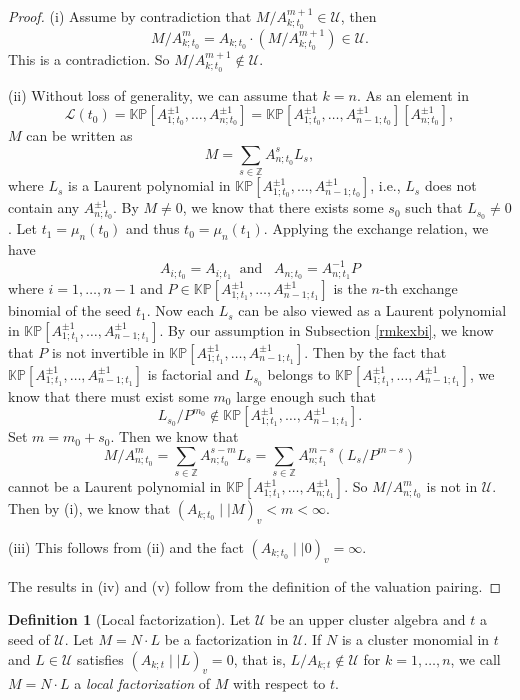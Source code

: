 \documentclass{amsart}
\theoremstyle{definition}
\newtheorem{definition}[theorem]{Definition}
\theoremstyle{remark}
\numberwithin{equation}{section}
\begin{document}
\begin{proof}
(i) Assume by contradiction that $M/A_{k;t_0}^{m+1}\in \mathcal U$, then $$M/A_{k;t_0}^m=A_{k;t_0}\cdot (M/A_{k;t_0}^{m+1})\in\mathcal U.$$ This is a contradiction. So $M/A_{k;t_0}^{m+1}\notin \mathcal U$.

(ii) Without loss of generality, we can assume that $k=n$.
As an element in $${\mathcal L}(t_0)=\mathbb {KP}[A_{1;t_0}^{\pm 1},\ldots,A_{n;t_0}^{\pm 1}]=\mathbb {KP}[A_{1;t_0}^{\pm 1},\ldots, A_{n-1;t_0}^{\pm 1}][A_{n;t_0}^{\pm 1}],$$
 $M$ can be written as
$$M=\sum\limits_{s\in\mathbb Z}A_{n;t_0}^sL_s,$$
where $L_s$ is a Laurent polynomial in $\mathbb {KP}[A_{1;t_0}^{\pm 1},\ldots, A_{n-1;t_0}^{\pm 1}]$, i.e., $L_s$ does not contain any $A_{n;t_0}^{\pm 1}$.
By $M\neq 0$, we know that there exists some $s_0$ such that $L_{s_0}\neq 0$.  Let $t_1=\mu_{n}(t_0)$ and thus $t_0=\mu_n(t_1)$. Applying the exchange relation, we have
 $$A_{i;t_0}=A_{i;t_1}\;\;\text{and}\;\;\; A_{n;t_0}=A_{n;t_1}^{-1}P$$
where $i=1,\ldots,n-1$ and $P\in\mathbb {KP}[A_{1;t_1}^{\pm 1},\ldots, A_{n-1;t_1}^{\pm 1}]$ is the $n$-th exchange  binomial of the seed $t_1$. Now each $L_s$ can be also viewed as a Laurent polynomial in  $\mathbb {KP}[A_{1;t_1}^{\pm 1},\ldots, A_{n-1;t_1}^{\pm 1}]$. By our assumption in Subsection \ref{rmkexbi}, we know that $P$ is not invertible in $\mathbb {KP}[A_{1;t_1}^{\pm 1},\ldots, A_{n-1;t_1}^{\pm 1}]$.
Then by the fact that $\mathbb {KP}[A_{1;t_1}^{\pm 1},\ldots, A_{n-1;t_1}^{\pm 1}]$ is factorial and $L_{s_0}$ belongs to  $\mathbb {KP}[A_{1;t_1}^{\pm 1},\ldots, A_{n-1;t_1}^{\pm 1}]$, we know that there must exist some $m_0$ large enough such that $$L_{s_0}/P^{m_0}\notin \mathbb {KP}[A_{1;t_1}^{\pm 1},\ldots, A_{n-1;t_1}^{\pm 1}].$$ Set $m=m_0+s_0$. Then we know that
$$
M/A_{n;t_0}^m=\sum\limits_{s\in\mathbb Z}A_{n;t_0}^{s-m}L_s=\sum\limits_{s\in\mathbb Z}A_{n;t_1}^{m-s}(L_s/P^{m-s})\nonumber
$$
cannot be a Laurent polynomial in $\mathbb {KP}[A_{1;t_1}^{\pm1},\ldots,A_{n;t_1}^{\pm1}]$. So $M/A_{n;t_0}^m$ is not in $\mathcal U$. Then by (i), we know that  $(A_{k;t_0}\mid\mid  M)_v<m<\infty$.

(iii) This follows from (ii) and the fact $(A_{k;t_0}\mid\mid  0)_v=\infty$.

The results in (iv) and (v) follow from the definition of the valuation pairing.
\end{proof}


\begin{definition}[Local factorization] \label{deflocal}
Let $\mathcal U$ be an upper cluster algebra and $t$ a seed of $\mathcal U$. Let $M=N\cdot L$ be a factorization in $\mathcal U$. If $N$ is a cluster monomial in $t$ and $L\in\mathcal U$ satisfies $(A_{k;t}\mid\mid  L)_v=0$, that is, $L/A_{k;t}\notin \mathcal U$ for $k=1,\ldots,n$, we call $M=N\cdot L$ a {\em local factorization} of $M$ with respect to $t$.
\end{definition}
\end{document}

